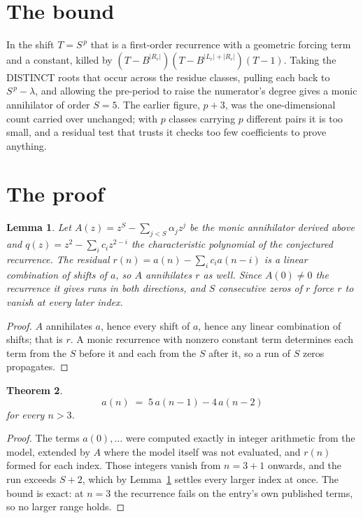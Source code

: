 \documentclass[11pt,a4paper]{article}
\theoremstyle{plain}
\newtheorem{theorem}{Theorem}
\newtheorem{lemma}[theorem]{Lemma}
\theoremstyle{definition}
\begin{document}
\section{The bound}

In the shift $T=S^{\,p}$ that is a first-order recurrence with a geometric forcing term and a
constant, killed by $(T-B^{|R_r|})(T-B^{|L_r|+|R_r|})(T-1)$. Taking the DISTINCT roots that
occur across the residue classes, pulling each back to $S^{\,p}-\lambda$, and allowing the
pre-period to raise the numerator's degree gives a monic annihilator of order $S=5$. The
earlier figure, $p+3$, was the one-dimensional count carried over unchanged; with $p$ classes
carrying $p$ different pairs it is too small, and a residual test that trusts it checks too few
coefficients to prove anything.

\section{The proof}

\begin{lemma}\label{lem:crit}
Let $A(z)=z^S-\sum_{j<S}\alpha_jz^{j}$ be the monic annihilator derived above and
$q(z)=z^{2}-\sum_ic_iz^{2-i}$ the characteristic polynomial of the conjectured
recurrence. The residual $r(n)=a(n)-\sum_ic_ia(n-i)$ is a linear combination of shifts of $a$,
so $A$ annihilates $r$ as well. Since $A(0)\ne0$ the recurrence it gives runs in both
directions, and $S$ consecutive zeros of $r$ force $r$ to vanish at every later index.
\end{lemma}

\begin{proof}
$A$ annihilates $a$, hence every shift of $a$, hence any linear combination of shifts; that is
$r$. A monic recurrence with nonzero constant term determines each term from the $S$ before it
and each from the $S$ after it, so a run of $S$ zeros propagates.
\end{proof}

\begin{theorem}
\[
a(n)\;=\;5\,a(n-1) - 4\,a(n-2)
\]
for every $n>3$.
\end{theorem}

\begin{proof}
The terms $a(0),\dots$ were computed exactly in integer arithmetic from the model, extended by
$A$ where the model itself was not evaluated, and $r(n)$ formed for each index. Those integers
vanish from $n=3+1$ onwards, and the run exceeds $S+2$, which by
Lemma~\ref{lem:crit} settles every larger index at once. The bound is exact: at $n=3$ the recurrence fails on the entry's own published terms, so no larger range holds.
\end{proof}
\end{document}
